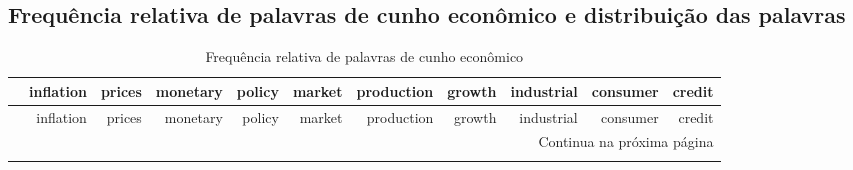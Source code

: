 \begin{landscape}
\chapter{Frequência relativa de palavras de cunho econômico e distribuição das palavras} \label{anexoa}

\begin{longtable}{rrrrrrrrrrr}
\caption{Frequência relativa de palavras de cunho econômico} \label{tab:long} \\
\hline
& inflation & prices & monetary & policy & market & production & growth & industrial & consumer & credit \\ \hline
\endfirsthead
 
\hline
& inflation & prices & monetary & policy & market & production & growth & industrial & consumer & credit \\ \hline
\endhead

\hline \multicolumn{11}{r}{{Continua na próxima página}} \\ \hline
\endfoot

\hline
\endlastfoot



\end{longtable}
\end{landscape}
